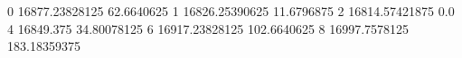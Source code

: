 0 16877.23828125 62.6640625
1 16826.25390625 11.6796875
2 16814.57421875 0.0
4 16849.375 34.80078125
6 16917.23828125 102.6640625
8 16997.7578125 183.18359375
